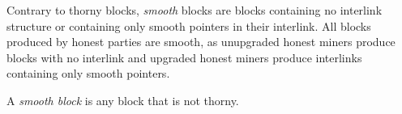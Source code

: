 Contrary to thorny blocks, \emph{smooth} blocks are blocks containing no interlink structure or containing only smooth pointers in their interlink. All blocks produced by honest parties are smooth, as unupgraded honest miners produce blocks with no interlink and upgraded honest miners produce interlinks containing only smooth pointers.

\begin{definition}
	A \emph{smooth block} is any block that is not thorny.
	\label{defn:smooth_block}
\end{definition}
